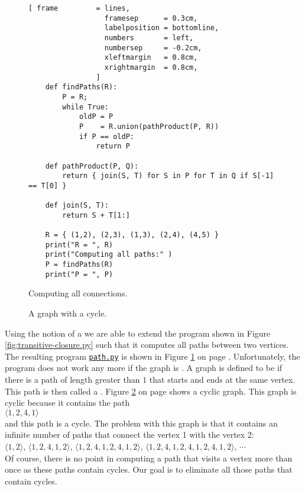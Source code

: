 \begin{figure}[!ht]
  \centering
\begin{Verbatim}[ frame         = lines, 
                  framesep      = 0.3cm, 
                  labelposition = bottomline,
                  numbers       = left,
                  numbersep     = -0.2cm,
                  xleftmargin   = 0.8cm,
                  xrightmargin  = 0.8cm,
                ]
    def findPaths(R):
        P = R;
        while True:
            oldP = P
            P    = R.union(pathProduct(P, R))
            if P == oldP:
                return P

    def pathProduct(P, Q):
        return { join(S, T) for S in P for T in Q if S[-1] == T[0] }
    
    def join(S, T):
        return S + T[1:]
    
    R = { (1,2), (2,3), (1,3), (2,4), (4,5) }
    print("R = ", R)
    print("Computing all paths:" )
    P = findPaths(R)
    print("P = ", P)
\end{Verbatim} 
\vspace*{-0.3cm}
\caption{Computing all connections.}  \label{fig:path.py}
\end{figure} %

\begin{figure}[!ht]
  \centering
  \vspace*{-9cm}

  \vspace*{-1cm}

  \caption{A graph with a cycle.}
  \label{fig:graph-zykl}
\end{figure}

Using the notion of a  we are able to extend the program shown in Figure
\ref{fig:transitive-closure.py} such that it computes all paths between two vertices.
The resulting program
\href{https://github.com/karlstroetmann/Logik/blob/master/Python/path.py}{\texttt{path.py}}
is shown in Figure \ref{fig:path.py} on page \pageref{fig:path.py}.
Unfortunately, the program does not work any more if the graph is .  A graph is defined
to be  if there is a path of length greater than $1$ that starts and ends at the same
vertex.  This path is then called a .
Figure \ref{fig:graph-zykl} on page \pageref{fig:graph-zykl} shows a cyclic graph.  This graph is
cyclic because it contains the path
\\[0.2cm]
\hspace*{1.3cm}
$\langle 1, 2, 4, 1 \rangle$
\\[0.2cm]
and this path is a cycle.
The problem with this graph is that it contains an infinite number of paths that connect the vertex
1 with the vertex 2: \\[0.2cm]
\hspace*{1.3cm}
$\langle 1, 2 \rangle$, $\langle 1, 2, 4, 1, 2 \rangle$, 
$\langle 1, 2, 4, 1, 2, 4, 1, 2 \rangle$, 
$\langle 1, 2, 4, 1, 2, 4, 1, 2, 4, 1, 2 \rangle$, $\cdots$
\\[0.2cm]
Of course, there is no point in computing a path that visits a vertex more than once as these paths
contain cycles.  Our goal is to eliminate all those paths that contain cycles.


